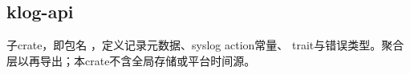 
\subsection{klog-api}

子crate，即包名 ，定义记录元数据、syslog action常量、 trait与错误类型。聚合层以再导出；本crate不含全局存储或平台时间源。


